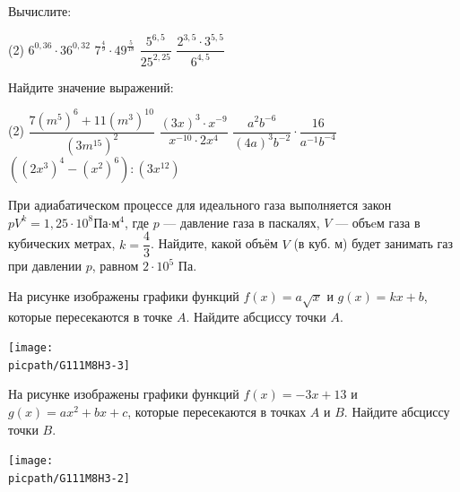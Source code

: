 \begin{homework}[number=3]
	\begin{listofex}
		\item Вычислите: %
		\begin{tasks}(2)
			\task \( 6^{0,36}\cdot 36^{0,32} \)
			\task \( 7^{\tfrac{ 4 }{ 9 }} \cdot 49^{\tfrac{ 5 }{ 18 }} \)
			\task \( \dfrac{ 5^{6,5} }{ 25^{2,25} } \)
			\task \( \dfrac{  2^{3,5}\cdot 3^{5,5}}{ 6^{4,5} } \)
		\end{tasks}
		\item Найдите значение выражений: %
		\begin{tasks}(2)
			\task \( \dfrac{ 7(m^5)^6+11(m^3)^{10} }{ (3m^{15})^2 } \)
			\task \( \dfrac{ (3x)^3\cdot x^{-9} }{ x^{-10}\cdot2x^4 } \)
			\task \( \dfrac{ a^2b^{-6} }{ (4a)^3b^{-2} }\cdot \dfrac{ 16 }{ a^{-1} b^{-4}} \)
			\task \( ((2x^3)^4-(x^2)^6):(3x^{12}) \)
		\end{tasks}
		\item При адиабатическом процессе для идеального газа выполняется закон \(pV^k=1,25 \cdot 10^8\)Па\(\cdot\)м\(^4\), где \(p\) --- давление газа в паскалях, \(V\) --- объeм газа в кубических метрах, \(k=\dfrac{  4}{ 3 }\).  Найдите, какой объём \(V\) (в куб. м) будет занимать газ при давлении \(p\), равном \(2\cdot10^5\) Па.
		\item
		\begin{minipage}[t]{0.65\linewidth}
			На рисунке изображены графики функций \(f(x)=a\sqrt{x} \) и \(g(x)=kx+b\), которые пересекаются в точке \(A\). Найдите абсциссу точки \(A\).
		\end{minipage}
		\begin{minipage}[t]{0.32\linewidth}
			\texttt{[image: \\picpath/G111M8H3-3]}
		\end{minipage}
		\item
		\begin{minipage}[t]{0.65\linewidth}
			На рисунке изображены графики функций \(f(x)=-3x+13\) и \(g(x)=ax^2+bx+c\), которые пересекаются в точках \(A\) и \(B\). Найдите абсциссу точки \(B\).
		\end{minipage}
		\begin{minipage}[t]{0.32\linewidth}
			\texttt{[image: \\picpath/G111M8H3-2]}
		\end{minipage}
		\item
		\begin{minipage}[t]{0.65\linewidth}

\end{minipage}
\end{listofex}
\end{homework}
